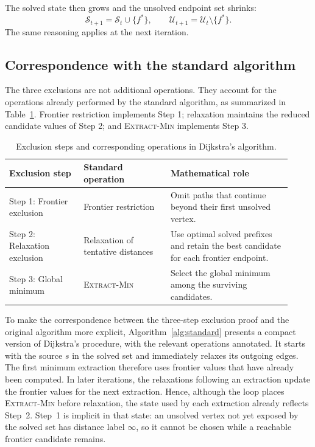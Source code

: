\documentclass[11pt]{article}
\newcommand{\Sset}{\mathcal{S}_t}
\newcommand{\Uset}{\mathcal{U}_t}
\begin{document}
The solved state then grows and the unsolved endpoint set shrinks:
\[
 \mathcal S_{t+1}=\Sset\cup\{f^*\},\qquad
 \mathcal U_{t+1}=\Uset\setminus\{f^*\}.
\]
The same reasoning applies at the next iteration.

\subsection{Correspondence with the standard algorithm}
\label{sec:correspondence}
The three exclusions are not additional operations. They account for the operations already performed by the standard algorithm, as summarized in Table~\ref{tab:correspondence}. Frontier restriction implements Step 1; relaxation maintains the reduced candidate values of Step 2; and \textsc{Extract-Min} implements Step 3.

\begin{table}[htbp]
\centering
\caption{Exclusion steps and corresponding operations in Dijkstra's algorithm.}
\label{tab:correspondence}
\small
\begin{tabular}{@{}p{0.24\linewidth}p{0.29\linewidth}p{0.39\linewidth}@{}}
\toprule
Exclusion step & Standard operation & Mathematical role \\
\midrule
Step 1: Frontier exclusion & Frontier restriction & Omit paths that continue beyond their first unsolved vertex. \\
Step 2: Relaxation exclusion & Relaxation of tentative distances & Use optimal solved prefixes and retain the best candidate for each frontier endpoint. \\
Step 3: Global minimum & \textsc{Extract-Min} & Select the global minimum among the surviving candidates. \\
\bottomrule
\end{tabular}
\end{table}

To make the correspondence between the three-step exclusion proof and the original algorithm more explicit, Algorithm~\ref{alg:standard} presents a compact version of Dijkstra's procedure, with the relevant operations annotated. It starts with the source $s$ in the solved set and immediately relaxes its outgoing edges. The first minimum extraction therefore uses frontier values that have already been computed. In later iterations, the relaxations following an extraction update the frontier values for the next extraction. Hence, although the loop places \textsc{Extract-Min} before relaxation, the state used by each extraction already reflects Step~2. Step~1 is implicit in that state: an unsolved vertex not yet exposed by the solved set has distance label $\infty$, so it cannot be chosen while a reachable frontier candidate remains.
\end{document}
